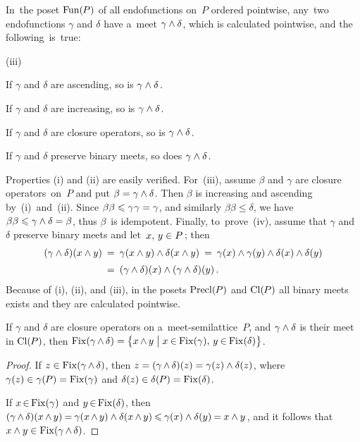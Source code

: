 \documentclass[11pt,letterpaper]{article}
\renewcommand{\thmskip}{\bigskip}
\renewcommand{\interskip}{\medskip}
\begin{document}
In~the poset $\mathop{\smash{\mathrm{Fun}}}\nolimits(\mspace{-1mu} P)$ of all endofunctions on~$P$ ordered pointwise,
any~two endofunctions $\gamma$ and $\delta$ have a~meet $\gamma\wedge\delta$,
	which is calculated pointwise,
and the following~is~true:
%
\begin{items}{(iii)}
\item[(i)] If $\gamma$ and $\delta$ are ascending, so is $\gamma\wedge\delta\mspace{1mu}$.
\item[(ii)] If $\gamma$ and $\delta$ are increasing, so is $\gamma\wedge\delta\mspace{1mu}$.
\item[(iii)] If $\gamma$ and $\delta$ are closure operators, so is $\gamma\wedge\delta\mspace{1mu}$.
\item[(iv)] If $\gamma$ and $\delta$ preserve binary meets, so does $\gamma\wedge\delta\mspace{1mu}$.
\end{items}%
%
\noindent Properties (i) and (ii) are easily verified.
%
For~(iii), assume $\beta$ and $\gamma$ are closure operators~on~$P$
and put $\beta = \gamma\wedge\delta$.
Then $\beta$ is increasing and ascending by~(i)~and~(ii).
Since $\beta\beta \leqslant \gamma\mspace{1mu}\gamma = \gamma$,
and similarly $\beta\beta \leq \delta$,
we have $\beta\beta \leqslant \gamma\wedge\delta = \beta$,
thus $\beta$~is idempotent.
Finally, to~prove~(iv), assume that $\gamma$ and $\delta$ preserve binary meets
	and let~$x,\,y\in P\mspace{2mu}$;
then
%
\begin{align*}
(\gamma\wedge\delta)(x\wedge y)
  & \:=\: \gamma(x\wedge y)\wedge\delta(x\wedge y)
  	\:=\: \gamma(x)\wedge\gamma(y)\wedge\delta(x)\wedge\delta(y)\\[0.5ex]
  & \:=\: (\gamma\wedge\delta)(x)\wedge(\gamma\wedge\delta)(y)\,.
\end{align*}
%
Because of (i), (ii), and (iii), in the posets $\mathop{\smash{\mathrm{Precl}}}\nolimits(\mspace{-1mu} P)$
	and $\mathop{\smash{\mathrm{Cl}}}\nolimits(\mspace{-1mu} P)$ all binary meets exists
and they are calculated pointwise.

\thmskip

\begin{proposition}\label{prop:Fix(alpha-meet-beta)-on-meetsemilatt}
If $\gamma$ and $\delta$  are closure operators on a~meet-semilattice~$P$,
and $\gamma\wedge\delta$ is their meet in $\mathop{\smash{\mathrm{Cl}}}\nolimits(\mspace{-1mu} P)$,
then $\mathop{\smash{\mathrm{Fix}}}\nolimits(\gamma\mspace{-1mu}\wedge\mspace{-1mu}\delta)
	= \bigl\{ x\mspace{-1mu}\wedge\mspace{-1mu} y\bigm| x\mspace{-1mu}\in\mspace{-1mu}\mathop{\smash{\mathrm{Fix}}}\nolimits(\gamma),\, y\mspace{-1mu}\in\mspace{-1mu}\mathop{\smash{\mathrm{Fix}}}\nolimits(\delta) \bigr\}$.
\end{proposition}

\interskip

\begin{proof}
If $z\in\mathop{\smash{\mathrm{Fix}}}\nolimits(\gamma\mspace{-1mu}\wedge\mspace{-1mu}\delta)$,
then $z = (\gamma\mspace{-1mu}\wedge\mspace{-1mu}\delta)(z) = \gamma(z) \wedge \delta(z)$,
where $\gamma(z)\in\gamma(\mspace{-1mu} P)=\mathop{\smash{\mathrm{Fix}}}\nolimits(\gamma)$ and $\delta(z)\in\delta(\mspace{-1mu} P)=\mathop{\smash{\mathrm{Fix}}}\nolimits(\delta)$.

If $x\mspace{-2mu}\in\mspace{-2mu}\mathop{\smash{\mathrm{Fix}}}\nolimits(\gamma)$ and $y\mspace{-2mu}\in\mspace{-2mu}\mathop{\smash{\mathrm{Fix}}}\nolimits(\delta)$,
then $(\gamma\mspace{-1mu}\wedge\mspace{-1mu}\delta)(x\mspace{-1mu}\wedge\mspace{-1mu} y)
	\mspace{-1mu}=\mspace{-1mu} \gamma(x\mspace{-1mu}\wedge\mspace{-1mu} y) \wedge \delta(x\mspace{-1mu}\wedge\mspace{-1mu} y)
	\mspace{-1mu}\leqslant\mspace{-1mu} \gamma(x) \wedge \delta(y)
	\mspace{-1mu}=\mspace{-1mu} x \wedge y\mspace{1mu}$,
and it follows that $x\wedge y\in \mathop{\smash{\mathrm{Fix}}}\nolimits(\gamma\mspace{-1mu}\wedge\mspace{-1mu}\delta)$.
\end{proof}
\end{document}
